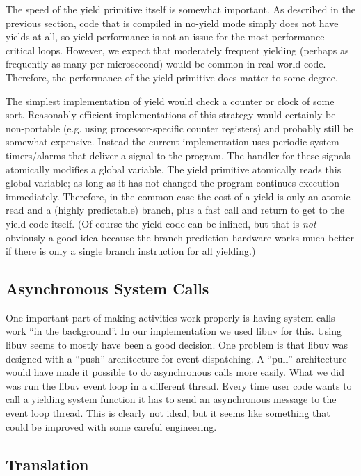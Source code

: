 \documentclass[10pt,preprint]{sigplanconf}
\begin{document}
The speed of the yield primitive itself is somewhat important.
As described in the previous section, code that is compiled in no-yield mode simply does not have yields at all, so yield performance is not an issue for the most performance critical loops.
However, we expect that moderately frequent yielding (perhaps as frequently as many per microsecond) would be common in real-world code.
Therefore, the performance of the yield primitive does matter to some degree.

The simplest implementation of yield would check a counter or clock of some sort.
Reasonably efficient implementations of this strategy would certainly be non-portable (e.g. using processor-specific counter registers) and probably still be somewhat expensive.
Instead the current \charcoal{} implementation uses periodic system timers/alarms that deliver a signal to the program.
The handler for these signals atomically modifies a global variable.
The yield primitive atomically reads this global variable; as long as it has not changed the program continues execution immediately.
Therefore, in the common case the cost of a yield is only an atomic read and a (highly predictable) branch, plus a fast call and return to get to the yield code itself.
(Of course the yield code can be inlined, but that is \emph{not} obviously a good idea because the branch prediction hardware works much better if there is only a single branch instruction for all yielding.)

\subsection{Asynchronous System Calls}

One important part of making activities work properly is having system calls work ``in the background''.
In our implementation we used libuv for this.
Using libuv seems to mostly have been a good decision.
One problem is that libuv was designed with a ``push'' architecture for event dispatching.
A ``pull'' architecture would have made it possible to do asynchronous calls more easily.
What we did was run the libuv event loop in a different thread.
Every time user code wants to call a yielding system function it has to send an asynchronous message to the event loop thread.
This is clearly not ideal, but it seems like something that could be improved with some careful engineering.

\subsection{Translation}
\end{document}
